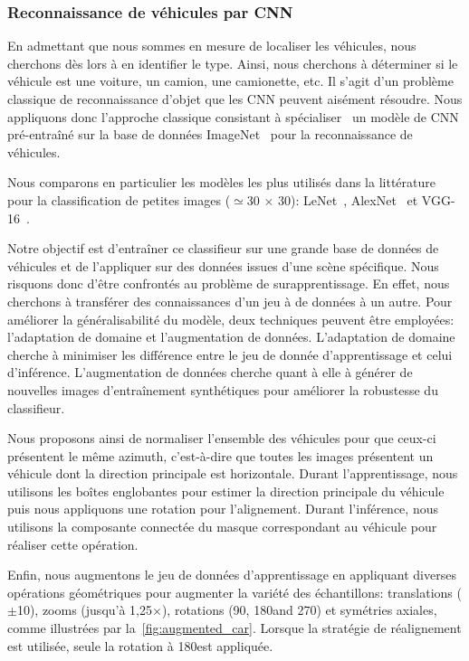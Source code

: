\subsubsection{Reconnaissance de véhicules par \gls{CNN}}

En admettant que nous sommes en mesure de localiser les véhicules, nous cherchons dès lors à en identifier le type. Ainsi, nous cherchons à déterminer si le véhicule est une voiture, un camion, une camionette, etc. Il s'agit d'un problème classique de reconnaissance d'objet que les \gls{CNN} peuvent aisément résoudre. Nous appliquons donc l'approche classique consistant à spécialiser~\cite{nogueira_towards_2016,zhou_deep_2016} un modèle de \gls{CNN} pré-entraîné sur la base de données ImageNet~\cite{russakovsky_imagenet_2015} pour la reconnaissance de véhicules.

Nous comparons en particulier les modèles les plus utilisés dans la littérature pour la classification de petites images ($\simeq$30 $\times$ 30): LeNet~\cite{lecun_gradient-based_1998}, AlexNet~\cite{krizhevsky_imagenet_2012} et VGG-16~\cite{simonyan_very_2014}.

Notre objectif est d'entraîner ce classifieur sur une grande base de données de véhicules et de l'appliquer sur des données issues d'une scène spécifique. Nous risquons donc d'être confrontés au problème de surapprentissage. En effet, nous cherchons à transférer des connaissances d'un jeu à de données à un autre. Pour améliorer la généralisabilité du modèle, deux techniques peuvent être employées: l'adaptation de domaine et l'augmentation de données. L'adaptation de domaine cherche à minimiser les différence entre le jeu de donnée d'apprentissage et celui d'inférence. L'augmentation de données cherche quant à elle à générer de nouvelles images d'entraînement synthétiques pour améliorer la robustesse du classifieur.

Nous proposons ainsi de normaliser l'ensemble des véhicules pour que ceux-ci présentent le même azimuth, c'est-à-dire que toutes les images présentent un véhicule dont la direction principale est horizontale. Durant l'apprentissage, nous utilisons les boîtes englobantes pour estimer la direction principale du véhicule puis nous appliquons une rotation pour l'alignement. Durant l'inférence, nous utilisons la composante connectée du masque correspondant au véhicule pour réaliser cette opération.

Enfin, nous augmentons le jeu de données d'apprentissage en appliquant diverses opérations géométriques pour augmenter la variété des échantillons: translations ($\pm$\SI{10}{\px}), zooms (jusqu'à 1,25$\times$), rotations (90\degre, 180\degre and 270\degre) et symétries axiales, comme illustrées par la~\cref{fig:augmented_car}. Lorsque la stratégie de réalignement est utilisée, seule la rotation à 180\degre est appliquée.

